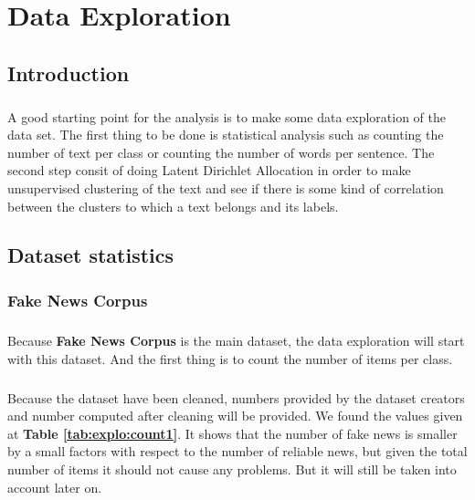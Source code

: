 
\chapter{Data Exploration}
\section{Introduction}
\paragraph{}
A good starting point for the analysis is to make some data exploration of the data set. The first thing to be done is statistical analysis such as counting the number of text per class or counting the number of words per sentence. The second step consit of doing Latent Dirichlet Allocation\cite{blei2003latent} in order to make unsupervised clustering of the text and see if there is some kind of correlation between the clusters to which a text belongs and its labels. 

\section{Dataset statistics}
\subsection{Fake News Corpus}
\paragraph{} Because \textbf{Fake News Corpus} is the main dataset, the data exploration will start with this dataset. And the first thing is to count the number of items per class. 

\paragraph{} Because the dataset have been cleaned, numbers provided by the dataset creators and number computed after cleaning will be provided. We found the values given at \textbf{Table \ref{tab:explo:count1}}. It shows that the number of fake news is smaller by a small factors with respect to the number of reliable news, but given the total number of items it should not cause any problems. But it will still be taken into account later on. 

